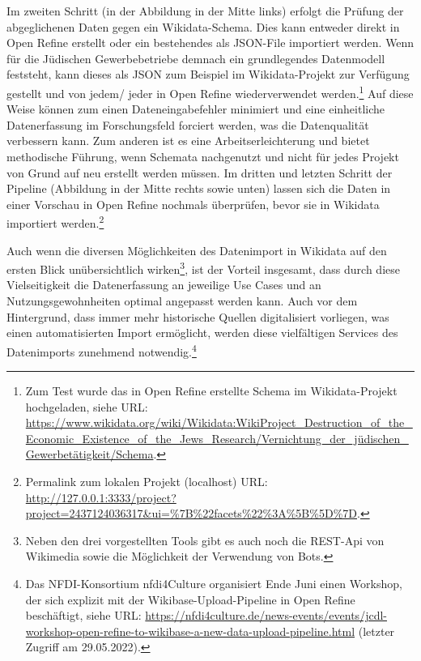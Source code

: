 Im zweiten Schritt (in der Abbildung in der Mitte links) erfolgt die Prüfung der abgeglichenen Daten gegen ein Wikidata-Schema. Dies kann entweder direkt in Open Refine erstellt oder ein bestehendes als JSON-File importiert werden. Wenn für die Jüdischen Gewerbebetriebe demnach ein grundlegendes Datenmodell feststeht, kann dieses als JSON zum Beispiel im Wikidata-Projekt zur Verfügung gestellt und von jedem/ jeder in Open Refine wiederverwendet werden.\footnote{Zum Test wurde das in Open Refine erstellte Schema im Wikidata-Projekt hochgeladen, siehe URL: \url{https://www.wikidata.org/wiki/Wikidata:WikiProject\_Destruction\_of\_the\_Economic\_Existence\_of\_the\_Jews\_Research/Vernichtung\_der\_jüdischen\_Gewerbetätigkeit/Schema}.} Auf diese Weise können zum einen Dateneingabefehler minimiert und eine einheitliche Datenerfassung im Forschungsfeld forciert werden, was die Datenqualität verbessern kann. Zum anderen ist es eine Arbeitserleichterung und bietet methodische Führung, wenn Schemata nachgenutzt und nicht für jedes Projekt von Grund auf neu erstellt werden müssen. Im dritten und letzten Schritt der Pipeline (Abbildung in der Mitte rechts sowie unten) lassen sich die Daten in einer Vorschau in Open Refine nochmals überprüfen, bevor sie in Wikidata importiert werden.\footnote{Permalink zum lokalen Projekt (localhost) URL: \url{http://127.0.0.1:3333/project?project=2437124036317\&ui=\%7B\%22facets\%22\%3A\%5B\%5D\%7D}.} 

Auch wenn die diversen Möglichkeiten des Datenimport in Wikidata auf den ersten Blick unübersichtlich wirken\footnote{Neben den drei vorgestellten Tools gibt es auch noch die REST-Api von Wikimedia sowie die Möglichkeit der Verwendung von Bots.}, ist der Vorteil insgesamt, dass durch diese Vielseitigkeit die Datenerfassung an jeweilige Use Cases und an Nutzungsgewohnheiten optimal angepasst werden kann. Auch vor dem Hintergrund, dass immer mehr historische Quellen digitalisiert vorliegen, was einen automatisierten Import ermöglicht, werden diese vielfältigen Services des Datenimports zunehmend notwendig.\footnote{Das NFDI-Konsortium nfdi4Culture organisiert Ende Juni einen Workshop, der sich explizit mit der Wikibase-Upload-Pipeline in Open Refine beschäftigt, siehe URL: \url{https://nfdi4culture.de/news-events/events/jcdl-workshop-open-refine-to-wikibase-a-new-data-upload-pipeline.html} (letzter Zugriff am 29.05.2022).}

